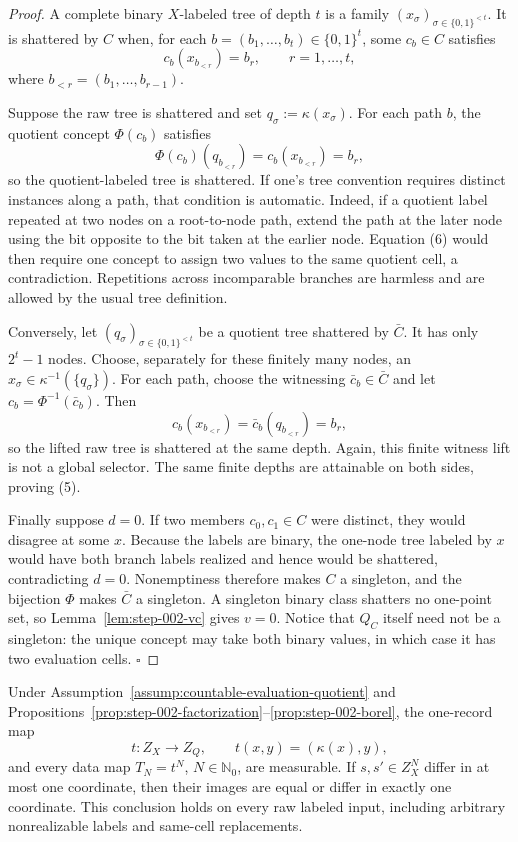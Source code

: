 \begin{proof}
A complete binary \(X\)-labeled tree of depth \(t\) is a family
\((x_\sigma)_{\sigma\in\{0,1\}^{<t}}\). It is shattered by \(C\) when, for
each \(b=(b_1,\ldots,b_t)\in\{0,1\}^t\), some \(c_b\in C\) satisfies
\[
c_b(x_{b_{<r}})=b_r,
\qquad r=1,\ldots,t,
\tag{6}
\]
where \(b_{<r}=(b_1,\ldots,b_{r-1})\).

Suppose the raw tree is shattered and set
\(q_\sigma:=\kappa(x_\sigma)\). For each path \(b\), the quotient concept
\(\Phi(c_b)\) satisfies
\[
\Phi(c_b)(q_{b_{<r}})=c_b(x_{b_{<r}})=b_r,
\]
so the quotient-labeled tree is shattered. If one's tree convention requires
distinct instances along a path, that condition is automatic. Indeed, if a
quotient label repeated at two nodes on a root-to-node path, extend the path
at the later node using the bit opposite to the bit taken at the earlier
node. Equation (6) would then require one concept to assign two values to the
same quotient cell, a contradiction. Repetitions across incomparable
branches are harmless and are allowed by the usual tree definition.

Conversely, let \((q_\sigma)_{\sigma\in\{0,1\}^{<t}}\) be a quotient tree
shattered by \(\bar C\). It has only \(2^t-1\) nodes. Choose, separately for
these finitely many nodes, an \(x_\sigma\in\kappa^{-1}(\{q_\sigma\})\). For
each path, choose the witnessing \(\bar c_b\in\bar C\) and let
\(c_b=\Phi^{-1}(\bar c_b)\). Then
\[
c_b(x_{b_{<r}})=\bar c_b(q_{b_{<r}})=b_r,
\]
so the lifted raw tree is shattered at the same depth. Again, this finite
witness lift is not a global selector. The same finite depths are attainable
on both sides, proving (5).

Finally suppose \(d=0\). If two members \(c_0,c_1\in C\) were distinct, they
would disagree at some \(x\). Because the labels are binary, the one-node
tree labeled by \(x\) would have both branch labels realized and hence would
be shattered, contradicting \(d=0\). Nonemptiness therefore makes \(C\) a
singleton, and the bijection \(\Phi\) makes \(\bar C\) a singleton. A
singleton binary class shatters no one-point set, so Lemma~\ref{lem:step-002-vc}
gives \(v=0\). Notice that \(Q_C\) itself need not be a singleton: the unique
concept may take both binary values, in which case it has two evaluation
cells. \(\square\)


\end{proof}

\begin{proposition}\label{prop:step-002-record-map}
Under Assumption~\ref{assump:countable-evaluation-quotient} and
Propositions~\ref{prop:step-002-factorization}--\ref{prop:step-002-borel},
the one-record map
\[
t:Z_X\to Z_Q,\qquad t(x,y)=(\kappa(x),y),
\tag{7}
\]
and every data map \(T_N=t^N\), \(N\in\mathbb N_0\), are measurable. If
\(s,s'\in Z_X^N\) differ in at most one coordinate, then their images are
equal or differ in exactly one coordinate. This conclusion holds on every
raw labeled input, including arbitrary nonrealizable labels and same-cell
replacements.


\end{proposition}

